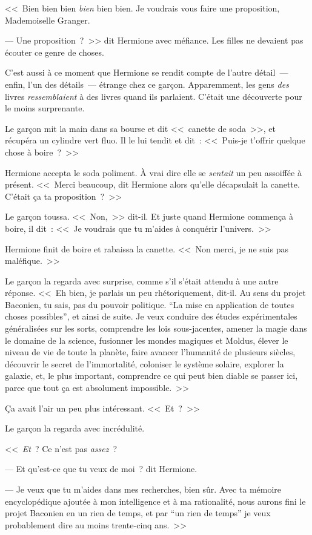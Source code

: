 <<~Bien bien bien \emph{bien} bien bien. Je voudrais vous faire une proposition, Mademoiselle Granger.

--- Une proposition~?~>> dit Hermione avec méfiance. Les filles ne devaient pas écouter ce genre de choses.

C'est aussi à ce moment que Hermione se rendit compte de l'autre détail~— enfin, l'un des détails~— étrange chez ce garçon. Apparemment, les gens \emph{des} livres \emph{ressemblaient} à des livres quand ils parlaient. C'était une découverte pour le moins surprenante.

Le garçon mit la main dans sa bourse et dit <<~canette de soda~>>, et récupéra un cylindre vert fluo. Il le lui tendit et dit~: <<~Puis-je t'offrir quelque chose à boire~?~>>

Hermione accepta le soda poliment. À vrai dire elle se \emph{sentait} un peu assoiffée à présent. <<~Merci beaucoup, dit Hermione alors qu'elle décapsulait la canette. C'était ça ta proposition~?~>>

Le garçon toussa. <<~Non,~>> dit-il. Et juste quand Hermione commença à boire, il dit~: <<~Je voudrais que tu m'aides à conquérir l'univers.~>>

Hermione finit de boire et rabaissa la canette. <<~Non merci, je ne suis pas maléfique.~>>

Le garçon la regarda avec surprise, comme s'il s'était attendu à une autre réponse. <<~Eh bien, je parlais un peu rhétoriquement, dit-il. Au sens du projet Baconien, tu sais, pas du pouvoir politique. “La mise en application de toutes choses possibles”, et ainsi de suite. Je veux conduire des études expérimentales généralisées sur les sorts, comprendre les lois sous-jacentes, amener la magie dans le domaine de la science, fusionner les mondes magiques et Moldus, élever le niveau de vie de toute la planète, faire avancer l'humanité de plusieurs siècles, découvrir le secret de l'immortalité, coloniser le système solaire, explorer la galaxie, et, le plus important, comprendre ce qui peut bien diable se passer ici, parce que tout ça est absolument impossible.~>>

Ça avait l'air un peu plus intéressant. <<~Et~?~>>

Le garçon la regarda avec incrédulité.

<<~\emph{Et}~? Ce n'est pas \emph{assez}~?

--- Et qu'est-ce que tu veux de moi~? dit Hermione.

--- Je veux que tu m'aides dans mes recherches, bien sûr. Avec ta mémoire encyclopédique ajoutée à mon intelligence et à ma rationalité, nous aurons fini le projet Baconien en un rien de temps, et par “un rien de temps” je veux probablement dire au moins trente-cinq ans.~>>

